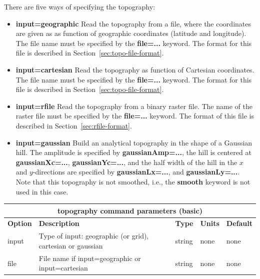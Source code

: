 \documentclass[11pt]{report}
\begin{document}
{There are five ways of specifying the topography:
\begin{itemize}
	\item {\bf input=geographic} Read the topography from a file, where the coordinates are given as as
	      function of geographic coordinates (latitude and longitude). The file name must be specified by
	      the {\bf file=...} keyword. The format for this file is described in Section~\ref{sec:topo-file-format}.
	\item {\bf input=cartesian} Read the topography as function of Cartesian coordinates. The file name
	      must be specified by the {\bf file=...} keyword. The format for this file is described in
	      Section~\ref{sec:topo-file-format}.
	\item {\bf input=rfile} Read the topography from a binary raster file. The name of the raster file
	      must be specified by the {\bf file=...} keyword. The format of this file is described in
	      Section~\ref{sec:rfile-format}.
	\item {\bf input=gaussian} Build an analytical topography in the shape of a Gaussian hill. The
	      amplitude is specified by {\bf gaussianAmp=...}, the hill is centered at {\bf gaussianXc=...},
	      {\bf gaussianYc=...}, and the half width of the hill in the $x$ and $y$-directions are specified by
		      {\bf gaussianLx=...}, and {\bf gaussianLy=...}. Note that this topography is not smoothed, i.e.,
	      the {\bf smooth} keyword is not used in this case.
\end{itemize}
%
\begin{center}
	\begin{tabular}{|l|p{8cm}|l|l|l|} \hline
		\multicolumn{5}{|c|}{\bf topography command parameters (basic)}                                                             \\ \hline
		\bf{Option} & \bf{Description}                                                      & \bf{Type} & \bf{Units} & \bf{Default} \\ \hline \hline
		input       & Type of input: geographic (or grid), cartesian or gaussian            & string    & none       & none         \\ \hline
		file        & File name if input=geographic or input=cartesian                      & string    & none       & none         \\ \hline

\end{tabular}
\end{center}}
\end{document}
